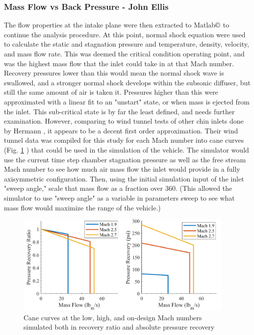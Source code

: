 \subsubsection{Mass Flow vs Back Pressure - John Ellis}
The flow properties at the intake plane were then extracted to Matlab$\copyright$ to continue the analysis procedure. At this point, normal shock equation were used to calculate the static and stagnation pressure and temperature, density, velocity, and mass flow rate. This was deemed the critical condition operating point, and was the highest mass flow that the inlet could take in at that Mach number. Recovery pressures lower than this would mean the normal shock wave is swallowed, and a stronger normal shock develops within the subsonic diffuser, but still the same amount of air is taken it. Pressures higher than this were approximated with a linear fit to an "unstart" state, or when mass is ejected from the inlet. This sub-critical state is by far the least defined, and needs further examination. However, comparing to wind tunnel tests of other chin inlets done by Hermann \cite{herrmann_2008}, it appears to be a decent first order approximation. Their wind tunnel data was compiled for this study for each Mach number into cane curves (Fig. \ref{fig:InletCane} ) that could be used in the simulation of the vehicle. The simulator would use the current time step chamber stagnation pressure as well as the free stream Mach number to see how much air mass flow the inlet would provide in a fully axisymmetric configuration. Then, using the initial simulation input of the inlet "sweep angle," scale that mass flow as a fraction over 360. (This allowed the simulator to use "sweep angle" as a variable in parameters sweep to see what mass flow would maximize the range of the vehicle.)

\begin{figure}[H]
\centering
\includegraphics[width=0.95\textwidth]{JWE_Figures/CaneCurves.png}
\caption{Cane curves at the low, high, and on-design Mach numbers simulated both in recovery ratio and absolute pressure recovery}
\label{fig:InletCane}
\end{figure}

